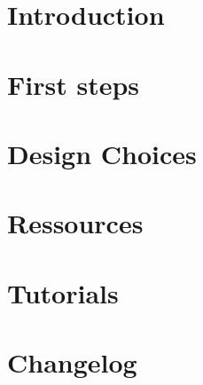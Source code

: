 \documentclass{include/thesisclass}
\begin{document}
    \FrontMatter

    

    \begingroup \let\clearpage\relax    %
    \tableofcontents                    %
    \listoffigures
    \endgroup
    \cleardoublepage
    
    \MainMatter

    \chapter{Introduction}
    
    
    \chapter{First steps}
    
    
    \chapter{Design Choices}
    \label{chap:designchoices}
    
    
    \chapter{Ressources}
    
    
	\chapter{Tutorials}
	
	
	
	\chapter*{Changelog}	
		
	
\end{document}
